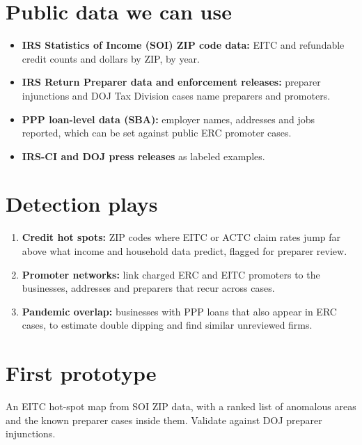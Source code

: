 \documentclass[letterpaper,11pt]{article}
\providecommand{\tightlist}{\setlength{\itemsep}{0pt}\setlength{\parskip}{0pt}}
\begin{document}
\hypertarget{public-data-we-can-use}{%
\section{Public data we can use}\label{public-data-we-can-use}}

\begin{itemize}
\tightlist
\item
  \textbf{IRS Statistics of Income (SOI) ZIP code data:} EITC and
  refundable credit counts and dollars by ZIP, by year.
\item
  \textbf{IRS Return Preparer data and enforcement releases:} preparer
  injunctions and DOJ Tax Division cases name preparers and promoters.
\item
  \textbf{PPP loan-level data (SBA):} employer names, addresses and jobs
  reported, which can be set against public ERC promoter cases.
\item
  \textbf{IRS-CI and DOJ press releases} as labeled examples.
\end{itemize}

\hypertarget{detection-plays}{%
\section{Detection plays}\label{detection-plays}}

\begin{enumerate}
\def\labelenumi{\arabic{enumi}.}
\tightlist
\item
  \textbf{Credit hot spots:} ZIP codes where EITC or ACTC claim rates
  jump far above what income and household data predict, flagged for
  preparer review.
\item
  \textbf{Promoter networks:} link charged ERC and EITC promoters to the
  businesses, addresses and preparers that recur across cases.
\item
  \textbf{Pandemic overlap:} businesses with PPP loans that also appear
  in ERC cases, to estimate double dipping and find similar unreviewed
  firms.
\end{enumerate}

\hypertarget{first-prototype}{%
\section{First prototype}\label{first-prototype}}

An EITC hot-spot map from SOI ZIP data, with a ranked list of anomalous
areas and the known preparer cases inside them. Validate against DOJ
preparer injunctions.
\end{document}
